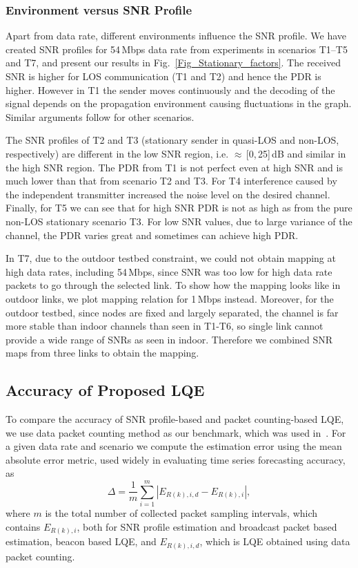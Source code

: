 \documentclass[11pt,draftclsnofoot,journal,onecolumn]{IEEEtran}
\begin{document}
\subsubsection{Environment versus SNR Profile}
\label{sec:env_vs_snr}

Apart from data rate, different environments influence the SNR profile. We have created SNR profiles for 54\,Mbps data rate from experiments in scenarios T1--T5 and T7, and present our results in Fig.~\ref{Fig_Stationary_factors}. The received SNR is higher for LOS communication (T1 and T2) and hence the PDR is higher. However in T1 the sender moves continuously and the decoding of the signal depends on the propagation environment causing fluctuations in the graph. Similar arguments follow for other scenarios.

The SNR profiles of T2 and T3 (stationary sender in quasi-LOS and non-LOS, respectively) are different in the low SNR region, i.e. $\approx$\,[0,\,25]\,dB and similar in the high SNR region. The PDR from T1 is not perfect even at high SNR and is much lower than that from scenario T2 and T3. For T4 interference caused by the independent transmitter increased the noise level on the desired channel. Finally, for T5 we can see that for high SNR PDR is not as high as from the pure non-LOS stationary scenario T3. For low SNR values, due to large variance of the channel, the PDR varies great and sometimes can achieve high PDR.

In T7, due to the outdoor testbed constraint, we could not obtain mapping at high data rates, including 54\,Mbps, since SNR was too low for high data rate packets to go through the selected link. To show how the mapping looks like in outdoor links, we plot mapping relation for 1\,Mbps instead. Moreover, for the outdoor testbed, since nodes are fixed and largely separated, the channel is far more stable than indoor channels than seen in T1-T6, so single link cannot provide a wide range of SNRs as seen in indoor. Therefore we combined SNR maps from three links to obtain the mapping.

\subsection{Accuracy of Proposed LQE}
\label{sec:LQE accuracy}

To compare the accuracy of SNR profile-based and packet counting-based LQE, we use data packet counting method as our benchmark, which was used in~\cite{zhang_2009_tmc}. For a given data rate and scenario we compute the estimation error using the mean absolute error metric, used widely in evaluating time series forecasting accuracy, as
\begin{equation}
\Delta=\frac{1}{m}\sum_{i=1}^{m}|E_{R(k),i,d}-E_{R(k),i}|,
\label{Eq_accuracy calculation}
\end{equation}
where $m$ is the total number of collected packet sampling intervals, which contains $E_{R(k),i}$, both for SNR profile estimation and broadcast packet based estimation, beacon based LQE, and $E_{R(k),i,d}$, which is LQE obtained using data packet counting.
\end{document}
